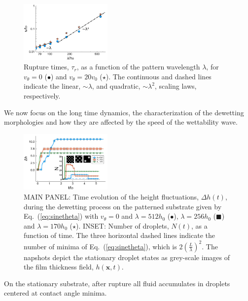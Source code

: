 \documentclass[twocolumn,amsmath,amssymb,showpacs,prl,superscriptaddress]{revtex4-1} %
\begin{document}
\begin{figure}
    \centering
    \includegraphics[width=0.4\textwidth]{Figure_2.pdf}
    \caption{Rupture times, $\tau_r$, as a function of the pattern wavelength $\lambda$, for $v_{\theta}=0$ (\textcolor{jlblue}{$\bullet$}) and $v_{\theta}=20 v_0$ 
    (\textcolor{jlorange}{$\star$}).
    The continuous and dashed lines indicate the linear, $\sim \lambda$, and quadratic, $\sim \lambda^2$, scaling laws, respectively.
        }
    \label{fig:model_rt}
\end{figure}
We now focus on the long time dynamics, the characterization of the dewetting morphologies and how they are affected by the speed of the wettability wave.
\begin{figure}
    \centering
    \includegraphics[width=0.4\textwidth]{Figure_3.pdf}
    \caption{MAIN PANEL: Time evolution of the height fluctuations, $\Delta h(t)$, during the dewetting process on the patterned substrate given by       
    Eq.~(\ref{eq:sinetheta})
    with $v_{\theta}= 0$ and $\lambda= 512 h_0$ (\textcolor{jlblue}{$\bullet$}), $\lambda=256 h_0$ (\textcolor{jlorange}{$\blacksquare$}) and $\lambda=170 h_0$ (\textcolor{jlgreen}{$\star$}).
    INSET: Number of droplets, $N(t)$, as a function of time. The three horizontal dashed lines indicate the number of minima of Eq.~(\ref{eq:sinetheta}),
      which is $2\left(\frac{L}{\lambda}\right)^2$. The napshots depict the stationary droplet states as grey-scale images
      of the film thickness field, $h(\mathbf{x},t)$.
      }
    \label{fig:clusters_v0_sine}
\end{figure}
On the stationary substrate, after rupture all fluid accumulates in droplets centered at contact angle minima.
\end{document}

